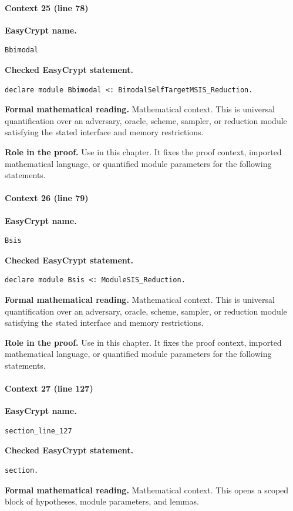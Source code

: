 \paragraph{Context 25 (line 78)}
\noindent\textbf{EasyCrypt name.}
\begin{lstlisting}[language=EasyCrypt,basicstyle=\ttfamily\scriptsize]
Bbimodal
\end{lstlisting}
\noindent\textbf{Checked EasyCrypt statement.}
\begin{lstlisting}[language=EasyCrypt,basicstyle=\ttfamily\scriptsize]
declare module Bbimodal <: BimodalSelfTargetMSIS_Reduction.
\end{lstlisting}
\noindent\textbf{Formal mathematical reading.}
Mathematical context. This is universal quantification over an adversary, oracle, scheme, sampler, or reduction module satisfying the stated interface and memory restrictions.

\noindent\textbf{Role in the proof.}
Use in this chapter. It fixes the proof context, imported mathematical language, or quantified module parameters for the following statements.

\paragraph{Context 26 (line 79)}
\noindent\textbf{EasyCrypt name.}
\begin{lstlisting}[language=EasyCrypt,basicstyle=\ttfamily\scriptsize]
Bsis
\end{lstlisting}
\noindent\textbf{Checked EasyCrypt statement.}
\begin{lstlisting}[language=EasyCrypt,basicstyle=\ttfamily\scriptsize]
declare module Bsis <: ModuleSIS_Reduction.
\end{lstlisting}
\noindent\textbf{Formal mathematical reading.}
Mathematical context. This is universal quantification over an adversary, oracle, scheme, sampler, or reduction module satisfying the stated interface and memory restrictions.

\noindent\textbf{Role in the proof.}
Use in this chapter. It fixes the proof context, imported mathematical language, or quantified module parameters for the following statements.

\paragraph{Context 27 (line 127)}
\noindent\textbf{EasyCrypt name.}
\begin{lstlisting}[language=EasyCrypt,basicstyle=\ttfamily\scriptsize]
section_line_127
\end{lstlisting}
\noindent\textbf{Checked EasyCrypt statement.}
\begin{lstlisting}[language=EasyCrypt,basicstyle=\ttfamily\scriptsize]
section.
\end{lstlisting}
\noindent\textbf{Formal mathematical reading.}
Mathematical context. This opens a scoped block of hypotheses, module parameters, and lemmas.

